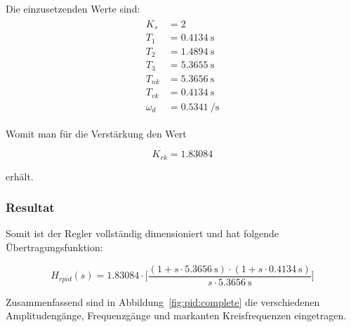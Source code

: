 Die einzusetzenden Werte sind:
\begin{gather} \label{eq:pid:h_o_k_rk_one}
    \begin{split}
        K_s         & = 2                        \\
        T_1         & = \SI{0.4134}{\second}     \\
        T_2         & = \SI{1.4894}{\second}     \\
        T_3         & = \SI{5.3655}{\second}     \\
        T_{nk}      & = \SI{5.3656}{\second}     \\
        T_{vk}      & = \SI{0.4134}{\second}     \\
        \omega_d    & = \SI{0.5341}{\per\second}
    \end{split}
\end{gather}

Womit man f\"ur die Verst\"arkung den Wert

\begin{equation} \label{eq:pid:k_rk_result}
    K_{rk} = 1.83084
\end{equation}

erh\"alt.


\subsubsection{Resultat}

Somit   ist  der   Regler   vollst\"andig  dimensioniert   und  hat   folgende
\"Ubertragungsfunktion:

\begin{equation} \label{eq:pid:result}
    H_{rpid}(s) = 1.83084 \cdot \biggl[ \frac{(1 + s \cdot \SI{5.3656}{\second} ) \cdot (1 + s \cdot \SI{0.4134}{\second} ) }{ s \cdot \SI{5.3656}{\second} } \biggr]
\end{equation}

Zusammenfassend  sind  in Abbildung~\ref{fig:pid:complete}  die  verschiedenen
Amplitudeng\"ange, Frequenzg\"ange und markanten Kreisfrequenzen eingetragen.

